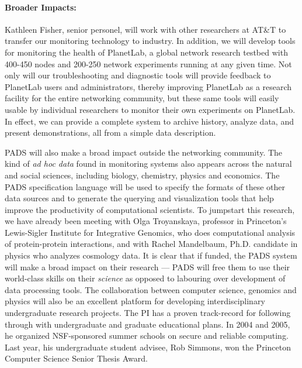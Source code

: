 \paragraph*{Broader Impacts:}  Kathleen Fisher, senior personel, 
will work with other researchers at AT\&T to transfer our monitoring
technology to industry.  In addition, we will develop tools for
monitoring the health of PlanetLab, a global network research testbed
with 400-450 nodes and 200-250 network experiments running at any
given time.  Not only will our troubleshooting and diagnostic tools
will provide feedback to PlanetLab users and administrators, thereby
improving PlanetLab as a research facility for the entire networking
community, but these same tools will easily usable by individual
researchers to monitor their own experiments on PlanetLab. In effect,
we can provide a complete system to archive history, analyze data, and
present demonstrations, all from a simple data description.

PADS will also make a broad impact outside the networking community.
The kind of {\em ad hoc data} found in monitoring systems also appears
across the natural and social sciences, including biology, chemistry,
physics and economics.  The PADS specification language will be used to
specify the formats of these other data sources and to generate the
querying and visualization tools that help improve
the productivity of computational scientists.  To jumpstart this
research, we have already been meeting with Olga Troyanskaya,
professor in Princeton's Lewis-Sigler Institute for Integrative
Genomics, who does computational analysis of protein-protein
interactions, and with Rachel Mandelbaum, Ph.D. candidate in physics
who analyzes cosmology data.  It is clear that if funded, the PADS system
will make a broad impact on their research --- PADS will free them to use
their world-class skills on their {\em science} 
as opposed to labouring over development of data processing tools.
The collaboration between computer science, genomics and physics will
also be an excellent platform for developing interdisciplinary
undergraduate research projects.  The PI has a proven track-record for
following through with undergraduate and graduate educational plans.
In 2004 and 2005, he organized NSF-sponsored summer schools on secure
and reliable computing.  Last year, his undergraduate student advisee,
Rob Simmons, won the Princeton Computer Science Senior Thesis Award.

